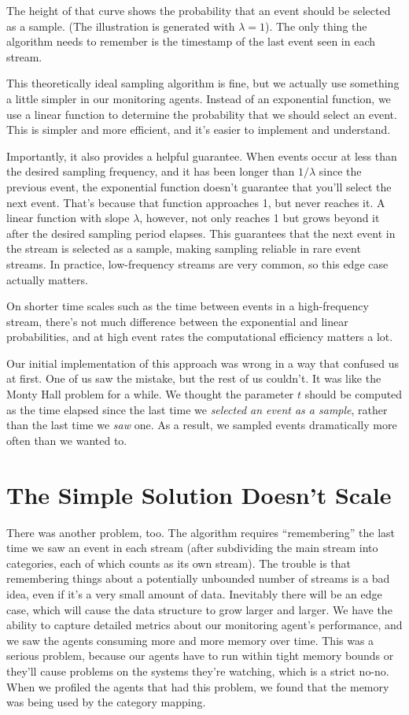 \documentclass{vivid_layout}
\begin{document}
The height of that curve shows the probability that an event should be selected
as a sample. (The illustration is generated with $\lambda = 1$).
The only thing the algorithm needs to remember is the timestamp of the last
event seen in each stream.

This theoretically ideal sampling algorithm is fine, but we actually use
something a little simpler in our monitoring agents. Instead of an exponential
function, we use a linear function to determine the probability that we should
select an event. This is simpler and more efficient, and it's easier to implement
and understand.

Importantly, it also provides a helpful guarantee. When events occur at less
than the desired sampling frequency, and it has been longer than $1/\lambda$
since the previous event, the exponential function doesn't guarantee that you'll
select the next event. That's because that function approaches 1, but never
reaches it. A linear function with slope $\lambda$, however, not only reaches 1
but grows beyond it after the desired sampling period elapses. This guarantees
that the next event in the stream is selected as a sample, making sampling
reliable in rare event streams. In practice, low-frequency streams are very
common, so this edge case actually matters.

On shorter time scales such as the time between events in a high-frequency
stream, there's not much difference between the exponential and linear
probabilities, and at high event rates the computational efficiency matters a
lot.

Our initial implementation of this approach was wrong in a way that confused us
at first. One of us saw the mistake, but the rest of us couldn't. It was like
the Monty Hall problem for a while. We thought the parameter $t$ should be
computed as the time elapsed since the last time we \emph{selected an event as a
sample}, rather than the last time we \emph{saw} one. As a result, we sampled
events dramatically more often than we wanted to.

\section{The Simple Solution Doesn't Scale}

There was another problem, too. The algorithm requires ``remembering'' the last
time we saw an event in each stream (after subdividing the main stream into
categories, each of which counts as its own stream). The trouble is that
remembering things about a potentially unbounded number of streams is a bad
idea, even if it's a very small amount of data. Inevitably there will be an edge
case, which will cause the data structure to grow larger and larger. We have the
ability to capture detailed metrics about our monitoring agent's performance,
and we saw the agents consuming more and more memory over time.  This was a
serious problem, because our agents have to run within tight memory bounds or
they'll cause problems on the systems they're watching, which is a strict no-no.
When we profiled the agents that had this problem, we found that the memory was
being used by the category mapping.
\end{document}
